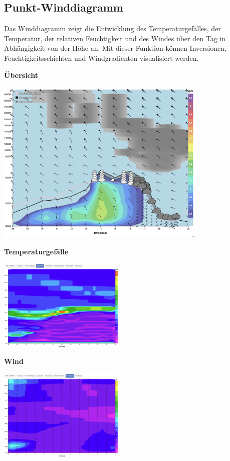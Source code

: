 \documentclass[11pt,a4paper]{article}
\begin{document}
\subsection{Punkt-Winddiagramm}
Das Winddiagramm zeigt die Entwicklung des Temperaturgefälles, der Temperatur, der relativen Feuchtigkeit und des Windes über den Tag in Abhängigkeit von der Höhe an. Mit dieser Funktion können Inversionen, Feuchtigkeitsschichten und Windgradienten visualisiert werden.
\begin{center}
\begin{minipage}{\textwidth}
\centering
\textbf{Übersicht}

\includegraphics[width=10cm]{images/windgram_overview.png}
\end{minipage}

\begin{minipage}{0.45\textwidth}
\centering
\textbf{Temperaturgefälle}

\includegraphics[width=6cm]{images/windgram_lapse.png}
\end{minipage}
\hfill
\begin{minipage}{0.45\textwidth}
\centering
\textbf{Wind}

\includegraphics[width=6cm]{images/windgram_wind.png}
\end{minipage}
\end{center}
\end{document}
